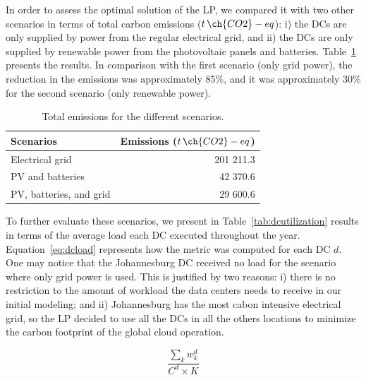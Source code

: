 In order to assess the optimal solution of the LP, we compared it with two other scenarios in terms of total carbon emissions ($t\,\ch{CO2}-eq$): i) the DCs are only supplied by power from the regular electrical grid, and ii) the DCs are only supplied by renewable power from the photovoltaic panels and batteries. Table~\ref{tab:emissions} presents the results. In comparison with the first scenario (only grid power), the reduction in the  emissions was approximately 85\%, and it was approximately 30\% for the second scenario (only renewable power).


\begin{table}[!ht]
\caption{Total emissions for the different scenarios.}\label{tab:emissions} \centering
\begin{tabular}{|p{5cm}|r|}
  \hline
  \textbf{Scenarios} & \textbf{Emissions ($t\,\ch{CO2}-eq$)}   \\
  \hline
  Electrical grid                    & 201 211.3    \\
  \hline
  PV and batteries  &                  42 370.6 \\ 
  \hline
  PV, batteries, and grid            &  29 600.6   \\
  \hline


\end{tabular}
\end{table}

To further evaluate these scenarios, we present in Table~\ref{tab:dcutilization} results in terms of the average load each DC executed throughout the year. Equation~\eqref{eq:dcload} represents how the metric was computed for each DC $d$. One may notice that the Johannesburg DC received no load for the scenario where only grid power is used. This is justified by two reasons: i) there is no restriction to the amount of workload the data centers needs to receive in our initial modeling; and ii) Johannesburg has the most cabon intensive electrical grid, so the LP decided to use all the DCs in all the others locations to minimize the carbon footprint of the global cloud operation.

\begin{equation}\label{eq:dcload}
\frac{\sum_k w^d_k} {C^d \times K }
\end{equation}


